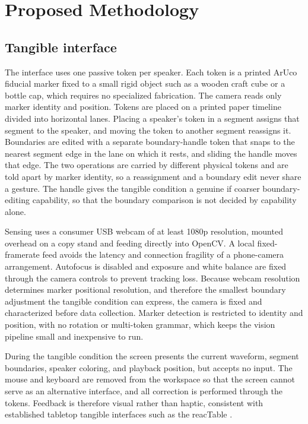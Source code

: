 \documentclass[10pt,a4paper,twocolumn]{article}
\begin{document}
\section{Proposed Methodology}\label{sec:method}

\subsection{Tangible interface}
\label{sec:method-tangible}

The interface uses one passive token per speaker. Each token is a
printed ArUco fiducial marker fixed to a small rigid object such
as a wooden craft cube or a bottle cap, which requires no
specialized fabrication. The camera reads only marker identity
and position. Tokens are placed on a printed paper timeline
divided into horizontal lanes. Placing a speaker's token in a
segment assigns that segment to the speaker, and moving the token
to another segment reassigns it. Boundaries are edited with a
separate boundary-handle token that snaps to the nearest segment
edge in the lane on which it rests, and sliding the handle moves
that edge. The two operations are carried by different physical
tokens and are told apart by marker identity, so a reassignment
and a boundary edit never share a gesture. The handle gives the
tangible condition a genuine if coarser boundary-editing
capability, so that the boundary comparison is not decided by
capability alone.

Sensing uses a consumer USB webcam of at least 1080p resolution,
mounted overhead on a copy stand and feeding directly into
OpenCV. A local fixed-framerate feed avoids the latency and
connection fragility of a phone-camera arrangement. Autofocus is
disabled and exposure and white balance are fixed through the
camera controls to prevent tracking loss. Because webcam
resolution determines marker positional resolution, and therefore
the smallest boundary adjustment the tangible condition can
express, the camera is fixed and characterized before data
collection. Marker detection is restricted to identity and
position, with no rotation or multi-token grammar, which keeps the
vision pipeline small and inexpensive to run.

During the tangible condition the screen presents the current
waveform, segment boundaries, speaker coloring, and playback
position, but accepts no input. The mouse and keyboard are
removed from the workspace so that the screen cannot serve as an
alternative interface, and all correction is performed through
the tokens. Feedback is therefore visual rather than haptic,
consistent with established tabletop tangible interfaces such as
the reacTable \citep{jorda2007reactable}.
\end{document}

